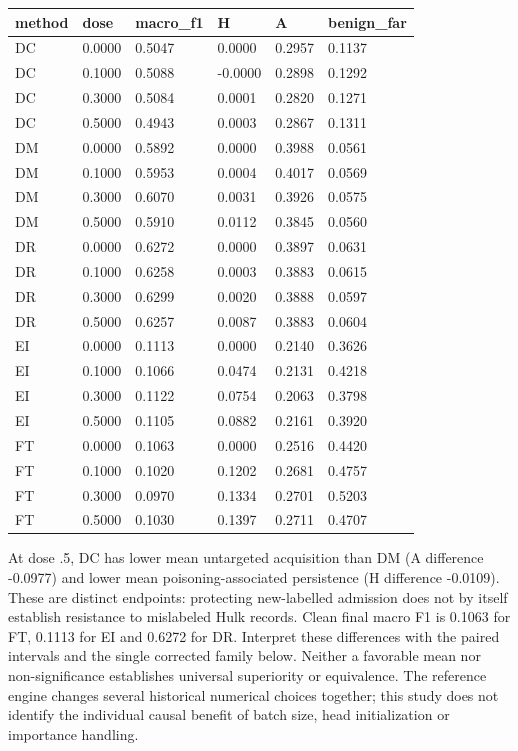 \documentclass[
  10pt,
  a4paper,
]{article}
\begin{document}
\begin{longtable}[]{@{}llllll@{}}
\toprule
method & dose & macro\_f1 & H & A & benign\_far \\
\midrule
\endhead
DC & 0.0000 & 0.5047 & 0.0000 & 0.2957 & 0.1137 \\
DC & 0.1000 & 0.5088 & -0.0000 & 0.2898 & 0.1292 \\
DC & 0.3000 & 0.5084 & 0.0001 & 0.2820 & 0.1271 \\
DC & 0.5000 & 0.4943 & 0.0003 & 0.2867 & 0.1311 \\
DM & 0.0000 & 0.5892 & 0.0000 & 0.3988 & 0.0561 \\
DM & 0.1000 & 0.5953 & 0.0004 & 0.4017 & 0.0569 \\
DM & 0.3000 & 0.6070 & 0.0031 & 0.3926 & 0.0575 \\
DM & 0.5000 & 0.5910 & 0.0112 & 0.3845 & 0.0560 \\
DR & 0.0000 & 0.6272 & 0.0000 & 0.3897 & 0.0631 \\
DR & 0.1000 & 0.6258 & 0.0003 & 0.3883 & 0.0615 \\
DR & 0.3000 & 0.6299 & 0.0020 & 0.3888 & 0.0597 \\
DR & 0.5000 & 0.6257 & 0.0087 & 0.3883 & 0.0604 \\
EI & 0.0000 & 0.1113 & 0.0000 & 0.2140 & 0.3626 \\
EI & 0.1000 & 0.1066 & 0.0474 & 0.2131 & 0.4218 \\
EI & 0.3000 & 0.1122 & 0.0754 & 0.2063 & 0.3798 \\
EI & 0.5000 & 0.1105 & 0.0882 & 0.2161 & 0.3920 \\
FT & 0.0000 & 0.1063 & 0.0000 & 0.2516 & 0.4420 \\
FT & 0.1000 & 0.1020 & 0.1202 & 0.2681 & 0.4757 \\
FT & 0.3000 & 0.0970 & 0.1334 & 0.2701 & 0.5203 \\
FT & 0.5000 & 0.1030 & 0.1397 & 0.2711 & 0.4707 \\
\bottomrule
\end{longtable}

At dose .5, DC has lower mean untargeted acquisition than DM (A
difference -0.0977) and lower mean poisoning-associated persistence (H
difference -0.0109). These are distinct endpoints: protecting
new-labelled admission does not by itself establish resistance to
mislabeled Hulk records. Clean final macro F1 is 0.1063 for FT, 0.1113
for EI and 0.6272 for DR. Interpret these differences with the paired
intervals and the single corrected family below. Neither a favorable
mean nor non-significance establishes universal superiority or
equivalence. The reference engine changes several historical numerical
choices together; this study does not identify the individual causal
benefit of batch size, head initialization or importance handling.
\end{document}
